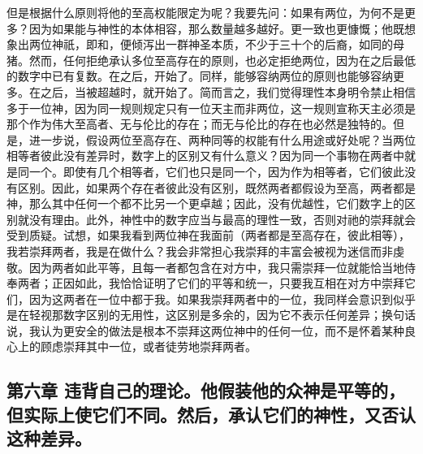 但是根据什么原则将他的至高权能限定为呢？我要先问：如果有两位，为何不是更多？因为如果能与神性的本体相容，那么数量越多越好。更一致也更慷慨；他既想象出两位神祇，即和，便倾泻出一群神圣本质，不少于三十个的后裔，如同的母猪。然而，任何拒绝承认多位至高存在的原则，也必定拒绝两位，因为在之后最低的数字中已有复数。在之后，开始了。同样，能够容纳两位的原则也能够容纳更多。在之后，当被超越时，就开始了。简而言之，我们觉得理性本身明令禁止相信多于一位神，因为同一规则规定只有一位天主而非两位，这一规则宣称天主必须是那个作为伟大至高者、无与伦比的存在；而无与伦比的存在也必然是独特的。但是，进一步说，假设两位至高存在、两种同等的权能有什么用途或好处呢？当两位相等者彼此没有差异时，数字上的区别又有什么意义？因为同一个事物在两者中就是同一个。即使有几个相等者，它们也只是同一个，因为作为相等者，它们彼此没有区别。因此，如果两个存在者彼此没有区别，既然两者都假设为至高，两者都是神，那么其中任何一个都不比另一个更卓越；因此，没有优越性，它们数字上的区别就没有理由。此外，神性中的数字应当与最高的理性一致，否则对祂的崇拜就会受到质疑。试想，如果我看到两位神在我面前（两者都是至高存在，彼此相等），我若崇拜两者，我是在做什么？我会非常担心我崇拜的丰富会被视为迷信而非虔敬。因为两者如此平等，且每一者都包含在对方中，我只需崇拜一位就能恰当地侍奉两者；正因如此，我恰恰证明了它们的平等和统一，只要我互相在对方中崇拜它们，因为这两者在一位中都于我。如果我崇拜两者中的一位，我同样会意识到似乎是在轻视那数字区别的无用性，这区别是多余的，因为它不表示任何差异；换句话说，我认为更安全的做法是根本不崇拜这两位神中的任何一位，而不是怀着某种良心上的顾虑崇拜其中一位，或者徒劳地崇拜两者。\par


\subsection{第六章 违背自己的理论。他假装他的众神是平等的，但实际上使它们不同。然后，承认它们的神性，又否认这种差异。}

